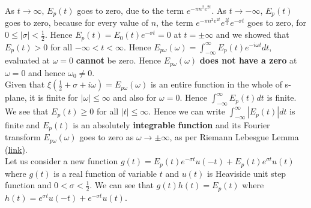 \documentclass[11pt]{elsarticle}
\begin{document}
As $t \to \infty$, $E_p(t)$  goes to zero, due to the term $e^{- \pi n^{2} e^{2t} }$.  As $t \to -\infty$, $E_p(t)$ goes to zero, because for every value of $n$, the term $e^{- \pi n^{2} e^{2t} } e^{\frac{5t}{2}} e^{-\sigma t}$ goes to zero, for $0 \leq |\sigma| < \frac{1}{2}$. Hence $E_p(t)= E_0(t) e^{-\sigma t} = 0$ at $t=\pm \infty$ and we showed that $E_p(t) > 0 $ for all $-\infty < t < \infty$. Hence $E_{p\omega}(\omega) = \int_{-\infty}^{\infty} E_p(t) e^{-i \omega t} dt$, evaluated at $\omega=0$ \textbf{cannot} be zero. Hence $E_{p\omega}(\omega)$ \textbf{does not have a zero} at $\omega=0$ and hence $\omega_{0} \neq 0$.\\




Given that $\xi(\frac{1}{2} + \sigma + i \omega)= E_{p\omega}(\omega)$ is an entire function in the whole of s-plane, it is finite for $|\omega| \leq \infty$ and also for $\omega=0$. Hence $\int_{-\infty}^{\infty} E_p(t) dt$ is finite. We see that $E_p(t) \geq 0$ for all $|t| \leq \infty$. Hence we can write $\int_{-\infty}^{\infty} |E_p(t)| dt$ is finite and $E_p(t)$ is an  absolutely \textbf{integrable function} and its Fourier transform $ E_{p\omega}(\omega)$ goes to zero as $\omega \to \pm \infty$, as per Riemann Lebesgue Lemma \href{https://en.wikipedia.org/wiki/Riemann-Lebesgue\_lemma}{(link)}.\\




Let us consider a new function  $g(t) = E_p(t) e^{-\sigma t}  u(-t) + E_p(t) e^{\sigma t}  u(t)  $ where $g(t)$ is a real function of variable $t$ and $u(t)$ is Heaviside unit step function and $0 < \sigma < \frac{1}{2}$. We can see that $g(t) h(t) = E_p(t)$ where $h(t)=  e^{ \sigma t} u(-t) + e^{ - \sigma t} u(t) $. \\
\end{document}

